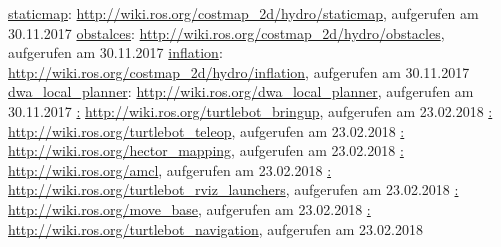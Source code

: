 \begin{thebibliography}{999}
 \href{http://wiki.ros.org/costmap_2d/hydro/staticmap}{staticmap}: \url{http://wiki.ros.org/costmap_2d/hydro/staticmap}, aufgerufen am 30.11.2017
 \href{http://wiki.ros.org/costmap_2d/hydro/obstacles}{obstalces}: \url{http://wiki.ros.org/costmap_2d/hydro/obstacles}, aufgerufen am 30.11.2017
 \href{http://wiki.ros.org/costmap_2d/hydro/inflation}{inflation}: \url{http://wiki.ros.org/costmap_2d/hydro/inflation}, aufgerufen am 30.11.2017
 \href{http://wiki.ros.org/dwa_local_planner}{dwa\_local\_planner}: \url{http://wiki.ros.org/dwa_local_planner}, aufgerufen am 30.11.2017
 \href{http://wiki.ros.org/turtlebot_bringup}: \url{http://wiki.ros.org/turtlebot_bringup}, aufgerufen am 23.02.2018
 \href{http://wiki.ros.org/turtlebot_teleop}: \url{http://wiki.ros.org/turtlebot_teleop}, aufgerufen am 23.02.2018
 \href{http://wiki.ros.org/hector_mapping}: \url{http://wiki.ros.org/hector_mapping}, aufgerufen am 23.02.2018
 \href{http://wiki.ros.org/amcl}: \url{http://wiki.ros.org/amcl}, aufgerufen am 23.02.2018
 \href{http://wiki.ros.org/turtlebot_rviz_launchers}: \url{http://wiki.ros.org/turtlebot_rviz_launchers}, aufgerufen am 23.02.2018
 \href{http://wiki.ros.org/move_base}: \url{http://wiki.ros.org/move_base}, aufgerufen am 23.02.2018
 \href{http://wiki.ros.org/turtlebot_navigation}: \url{http://wiki.ros.org/turtlebot_navigation}, aufgerufen am 23.02.2018





\end{thebibliography}